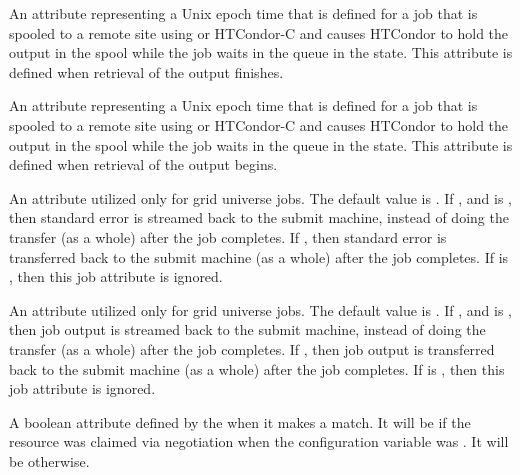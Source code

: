 \begin{description}
\item[\AdAttr{StageOutFinish}:]   
An attribute representing a Unix epoch time that is defined for a job that is
spooled to a remote site using  or HTCondor-C
and causes HTCondor to hold the output in the spool while the job waits 
in the queue in the  state.
This attribute is defined when retrieval of the output finishes.

\item[\AdAttr{StageOutStart}:]   
An attribute representing a Unix epoch time that is defined for a job that is
spooled to a remote site using  or HTCondor-C
and causes HTCondor to hold the output in the spool while the job waits 
in the queue in the  state.
This attribute is defined when retrieval of the output begins.

\item[\AdAttr{StreamErr}:]   
An attribute utilized only for grid universe jobs.
The default value is .
If , and  is , then 
standard error is streamed back to the submit machine, instead
of doing the transfer (as a whole) after the job completes.
If , then
standard error is transferred back to the submit machine
(as a whole) after the job completes.
If  is , then this job attribute is ignored.

\item[\AdAttr{StreamOut}:]   
An attribute utilized only for grid universe jobs.
The default value is .
If , and  is , then 
job output is streamed back to the submit machine, instead
of doing the transfer (as a whole) after the job completes.
If , then
job output is transferred back to the submit machine
(as a whole) after the job completes.
If  is , then this job attribute is ignored.

\item[\AdAttr{SubmitterAutoregroup}:]  A boolean attribute defined
by the  when it makes a match. 
It will be  if the resource was claimed via negotiation
when the configuration variable  was .
It will be  otherwise.


\end{description}
